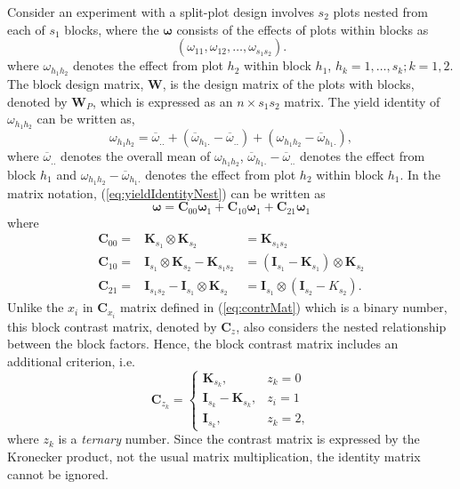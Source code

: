 \documentclass[article]{jss}
\newcommand{\I}{\mathbf{I}}
\newcommand{\K}{\mathbf{K}}
\newcommand{\C}{\mathbf{C}}
\newcommand{\W}{\mathbf{W}}
\begin{document}
Consider an experiment with a split-plot design involves $s_2$ plots nested from each of $s_1$ blocks, where the $\bm{\omega}$ consists of the effects of plots within blocks as    
\begin{equation}\label{eq:blockParSplitBlk1}
 (\omega_{11}, \omega_{12}, \dots, \omega_{s_1 s_2}). 
\end{equation}
where $\omega_{h_1 h_2}$ denotes the effect from plot $h_2$ within block $h_1$, $h_k = 1, \dots, s_k; k = 1, 2$. The block design matrix, $\W$, is the design matrix of the plots with blocks, denoted by $\W_P$, which is expressed as an $n \times s_1 s_2$ matrix. The yield identity of $\omega_{h_1 h_2}$ can be written as,
\begin{equation}
\label{eq:yieldIdentityNest}
\omega_{h_1 h_2} = \overline{\omega}_{..}+(\overline{\omega}_{h_1 .} -\overline{\omega}_{..}) + (\omega_{h_1 h_2} - \overline{\omega}_{h_1 .}),
\end{equation}
where $\overline{\omega}_{..}$ denotes the overall mean of $\omega_{h_1 h_2}$, $\overline{\omega}_{h_1 .} -\overline{\omega}_{..}$ denotes the effect from block $h_1$ and $\omega_{h_1 h_2} - \overline{\omega}_{h_1 .}$ denotes the effect from plot $h_2$ within block $h_1$. In the matrix notation, (\ref{eq:yieldIdentityNest}) can be written as 
\[
\bm{\omega} = \C_{00} \bm{\omega}_1 + \C_{10}\bm{\omega}_1 + \C_{21}\bm{\omega}_1
\]
where
\begin{eqnarray}
\nonumber \C_{00} = & \K_{s_1} \otimes \K_{s_2}& = \K_{s_1 s_2}\\
\nonumber \C_{10} = & \I_{s_1} \otimes \K_{s_2} - \K_{s_1 s_2}& = (\I_{s_1} - \K_{s_1}) \otimes \K_{s_2} \\
\nonumber \C_{21} = & \I_{s_1 s_2} - \I_{s_1} \otimes \K_{s_2} & =  \I_{s_1} \otimes (\I_{s_2} - K_{s_2}).
\end{eqnarray}
Unlike the $x_i$ in $\C_{x_i}$ matrix defined in (\ref{eq:contrMat}) which is a binary number, this block contrast matrix, denoted by $\C_z$, also considers the nested relationship between the block factors. Hence, the block contrast matrix includes an additional criterion, i.e.\
\begin{equation}
\label{eq:contrMat1}
\C_{z_k} =
   \begin{cases}
       \K_{s_k}, & z_k = 0 \\
       \I_{s_k} - \K_{s_k}, & z_i = 1\\
        \I_{s_k}, & z_k = 2,
    \end{cases}
\end{equation}
where $z_k$ is a \emph{ternary} number. Since the contrast matrix is expressed by the Kronecker product, not the usual matrix multiplication, the identity matrix cannot be ignored. 
\end{document}
